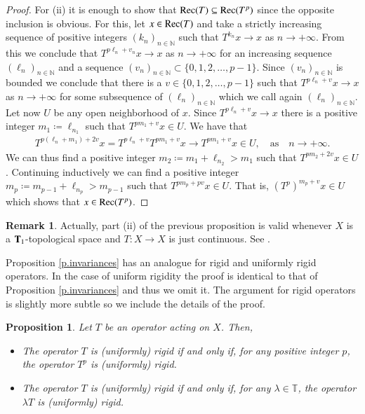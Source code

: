\documentclass[12pt,leqno]{amsart}
\theoremstyle{plain}
\newtheorem{proposition}[equation]{Proposition}
\theoremstyle{definition}
\newtheorem{remark}[equation]{Remark}
\numberwithin{equation}{section}
\begin{document}
\begin{proof}
	For (ii) it is enough to show that ${\textnormal{Rec}}(T)\subseteq{\textnormal{Rec}}(T^p)$ since the opposite inclusion is obvious. For this, let $x\in{\textnormal{Rec}}(T)$ and take a strictly increasing sequence of positive integers $(k_n)_{n\in\mathbb N}$ such that $T^{k_n}x\to x$ as $n\to +\infty$. From this we conclude that $T^{p\ell_n+v_n}x\to x$ as $n\to +\infty$ for an increasing sequence $(\ell_n)_{n\in\mathbb N}$ and a sequence $(v_n)_{n\in\mathbb N}\subset \{0,1,2,\ldots,p-1\}$. Since $(v_n)_{n\in\mathbb N}$ is bounded we conclude that there is a $v\in\{0,1,2,\ldots,p-1\}$ such that $T^{p\ell_n+v}x \to x$ as $n\to +\infty$ for some subsequence of $(\ell_n)_{n\in\mathbb N}$ which we call again $(\ell_n)_{n\in\mathbb N}$. Let now $U$ be any open neighborhood of $x$. Since $T^{p\ell_n+v}x\to x$ there is a positive integer $m_1\coloneqq \ell_{n_1}$ such that $T^{pm_1+v}x\in U$. We have that 
	\begin{align*}
		T^{p(\ell_n+m_1)+2v}x=T^{p\ell_n+v}T^{pm_1+v}x\longrightarrow T^{pm_1+v}x\in U,\quad\text{as}\quad n\to +\infty. 
	\end{align*}
	We can thus find a positive integer $m_2\coloneqq m_1+\ell_{n_2}>m_1$ such that $T^{pm_2+2v}x\in U$. Continuing inductively we can find a positive integer $m_p\coloneqq m_{p-1}+\ell_{n_p}>m_{p-1}$ such that $T^{pm_p+pv}x\in U$. That is, $(T^p)^{m_p+v}x\in U$ which shows that $x\in {\textnormal{Rec}}(T^p)$. 
\end{proof}

\begin{remark}
	Actually, part (ii) of the previous proposition is valid whenever $X$ is a $\textbf T_1$-topological space and $T:X\to X$ is just continuous. See \cite{GOTT}. 
\end{remark}

Proposition \ref{p.invariances} has an analogue for rigid and uniformly rigid operators. In the case of uniform rigidity the proof is identical to that of Proposition \ref{p.invariances} and thus we omit it. The argument for rigid operators is slightly more subtle so we include the details of the proof.

\begin{proposition}\label{p.rigidinv} Let $T$ be an operator acting on $X$. Then,
\begin{itemize}
 \item [(i)] The operator $T$ is (uniformly) rigid if and only if, for any positive integer $p$, the operator $T^p$ is (uniformly) rigid.
 \item [(ii)] The operator $T$ is (uniformly) rigid if and only if, for any $\lambda \in\mathbb T$, the operator $\lambda T$ is (uniformly) rigid.
\end{itemize} 
\end{proposition}
\end{document}
